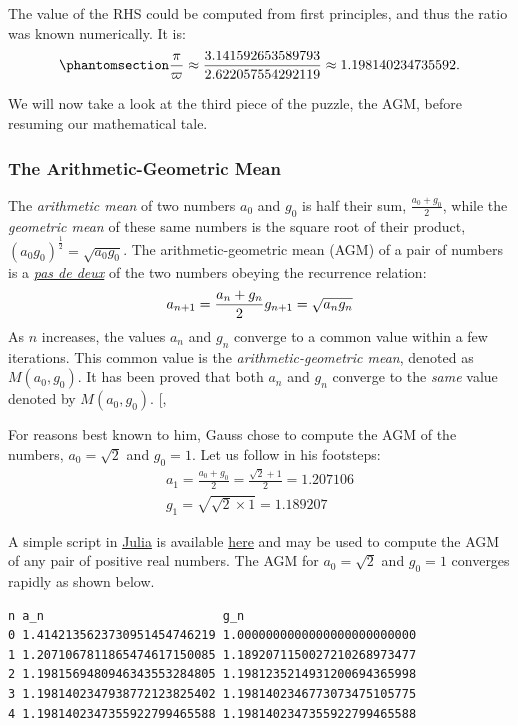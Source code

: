 \documentclass[
  a4paper,
]{article}
\begin{document}
The value of the RHS could be computed from first principles, and thus
the ratio was known numerically. It is:
\begin{equation}\phantomsection\label{eq:pi-varpi-ratio}{
\frac{\pi}{\varpi} \approx \frac{3.141592653589793}{2.622057554292119} \approx 1.198140234735592.
}\end{equation}

We will now take a look at the third piece of the puzzle, the AGM,
before resuming our mathematical tale.

\subsubsection{The Arithmetic-Geometric
Mean}\label{the-arithmetic-geometric-mean}

The \emph{arithmetic mean} of two numbers \(a_0\) and \(g_0\) is half
their sum, \(\frac{a_0 + g_0}{2}\), while the \emph{geometric mean} of
these same numbers is the square root of their product,
\((a_0g_0)^{\frac{1}{2}} = \sqrt{a_0 g_0}\). The arithmetic-geometric
mean (AGM) of a pair of numbers is a
\href{https://www.thefreedictionary.com/pas+de+deux}{\emph{pas de deux}}
of the two numbers obeying the recurrence relation: \[
a_{n+1} = \frac{a_n + g_n}{2}\\
g_{n+1} = \sqrt{a_n g_n}
\] As \(n\) increases, the values \(a_n\) and \(g_n\) converge to a
common value within a few iterations. This common value is the
\emph{arithmetic-geometric mean}, denoted as \(M(a_0, g_0)\). It has
been proved that both \(a_n\) and \(g_n\) converge to the \emph{same}
value denoted by \(M(a_0, g_0)\).
{[},\citeproc{ref-pi-and-the-agm}{36}{]}

For reasons best known to him, Gauss chose to compute the AGM of the
numbers, \(a_0 = \sqrt{2}\) and \(g_0 = 1\). Let us follow in his
footsteps: \[
\begin{aligned}
a_1 = \frac{a_0 + g_0}{2} = \frac{\sqrt{2} + 1}{2} = 1.207106\\
g_1 = \sqrt{\sqrt{2} \times 1} = 1.189207
\end{aligned}
\]

A simple script in \href{https://julialang.org/}{Julia} is available
\href{auxiliary/agm-float.jl}{here} and may be used to compute the AGM
of any pair of positive real numbers. The AGM for \(a_0 = \sqrt{2}\) and
\(g_0 = 1\) converges rapidly as shown below.

\begin{verbatim}
n a_n                         g_n
0 1.4142135623730951454746219 1.0000000000000000000000000
1 1.2071067811865474617150085 1.1892071150027210268973477
2 1.1981569480946343553284805 1.1981235214931200694365998
3 1.1981402347938772123825402 1.1981402346773073475105775
4 1.1981402347355922799465588 1.1981402347355922799465588
\end{verbatim}
\end{document}
